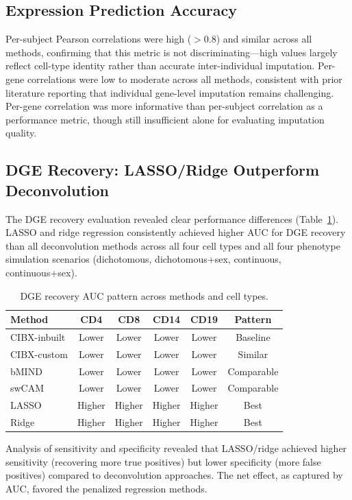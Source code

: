\documentclass[12pt]{article}
\begin{document}
\subsection{Expression Prediction Accuracy}

Per-subject Pearson correlations were high ($>$0.8) and similar across all methods, confirming that this metric is not discriminating---high values largely reflect cell-type identity rather than accurate inter-individual imputation. Per-gene correlations were low to moderate across all methods, consistent with prior literature reporting that individual gene-level imputation remains challenging. Per-gene correlation was more informative than per-subject correlation as a performance metric, though still insufficient alone for evaluating imputation quality.

\subsection{DGE Recovery: LASSO/Ridge Outperform Deconvolution}

The DGE recovery evaluation revealed clear performance differences (Table~\ref{tab:dge}). LASSO and ridge regression consistently achieved higher AUC for DGE recovery than all deconvolution methods across all four cell types and all four phenotype simulation scenarios (dichotomous, dichotomous+sex, continuous, continuous+sex).

\begin{table}[htbp]
\centering
\caption{DGE recovery AUC pattern across methods and cell types.}
\label{tab:dge}
\begin{tabular}{lccccc}
\toprule
Method & CD4 & CD8 & CD14 & CD19 & Pattern \\
\midrule
CIBX-inbuilt & Lower & Lower & Lower & Lower & Baseline \\
CIBX-custom & Lower & Lower & Lower & Lower & Similar \\
bMIND & Lower & Lower & Lower & Lower & Comparable \\
swCAM & Lower & Lower & Lower & Lower & Comparable \\
LASSO & Higher & Higher & Higher & Higher & Best \\
Ridge & Higher & Higher & Higher & Higher & Best \\
\bottomrule
\end{tabular}
\end{table}

Analysis of sensitivity and specificity revealed that LASSO/ridge achieved higher sensitivity (recovering more true positives) but lower specificity (more false positives) compared to deconvolution approaches. The net effect, as captured by AUC, favored the penalized regression methods.
\end{document}
